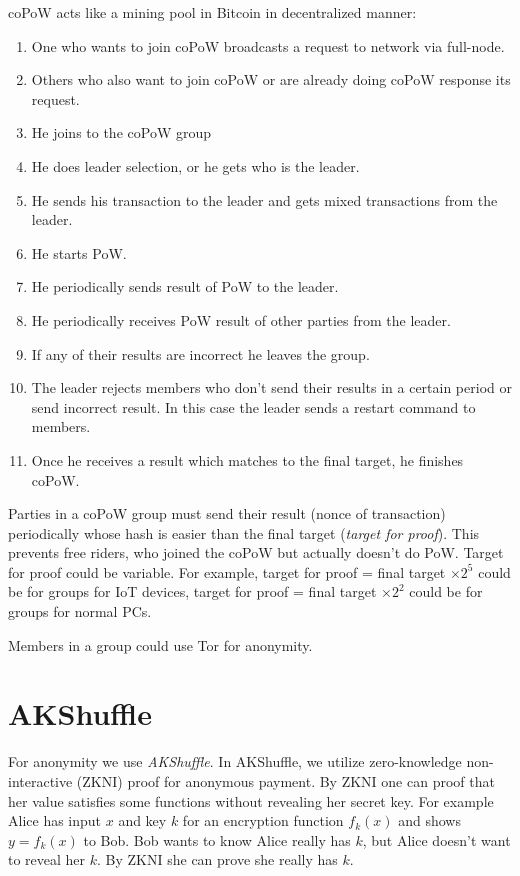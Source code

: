 \documentclass[a4paper,10pt,twocolumn]{article}
\begin{document}
coPoW acts like a mining pool in Bitcoin in decentralized manner:

\vspace{-0.5\baselineskip}
\begin{enumerate}
	\setlength\itemsep{0em}
	\item One who wants to join coPoW broadcasts a request to network via full-node.
	\item Others who also want to join coPoW or are already doing coPoW response its request.
	\item He joins to the coPoW group
	\item He does leader selection, or he gets who is the leader.
	\item He sends his transaction to the leader and gets mixed transactions from the leader.
	\item He starts PoW.
	\item He periodically sends result of PoW to the leader.
	\item He periodically receives PoW result of other parties from the leader. 
	\item If any of their results are incorrect he leaves the group.
	\item The leader rejects members who don't send their results in a certain period or send incorrect result. In this case the leader
	sends a restart command to members.
	\item Once he receives a result which matches to the final target, he finishes coPoW.
\end{enumerate}

Parties in a coPoW group must send their result (nonce of transaction) periodically whose hash 
is easier than the final target (\emph{target for proof}). This prevents free riders, who joined the coPoW but actually doesn't do PoW.
Target for proof could be variable. For example, target for proof = final target \(  \times 2^5 \) could be for groups for IoT devices,
target for proof = final target  \( \times 2^2 \) could be for groups for normal PCs.

Members in a group could use Tor for anonymity.


\section{AKShuffle}
\label{sec:aks}

For anonymity we use \emph{AKShuffle}. In AKShuffle, we utilize zero-knowledge non-interactive (ZKNI) proof for
anonymous payment. By ZKNI one can proof that her value satisfies some functions without revealing her secret key.
For example Alice has input \(x\)  and key \( k \)  for an encryption function \( f_{k}(x) \) and shows \( y=f_k(x) \) to Bob.
Bob wants to know Alice really has \(k\), but Alice doesn't want to reveal her \(k\).
By ZKNI  she can prove she really has \( k\).
\end{document}
